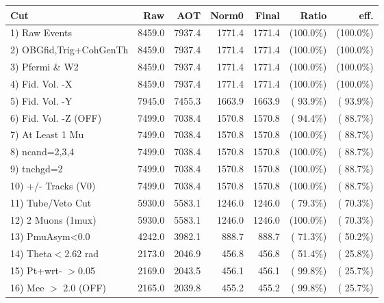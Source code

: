  \begin{table}[h!]\centering
 \begin{tabular}{||l||r|r|r|r|r|r||}
 \hline
 \hline
 Cut & Raw & AOT & Norm0 & Final & Ratio & eff.       \\
 \hline
  1) Raw Events           &       8459.0 &       7937.4 &       1771.4 &       1771.4 & (100.0\%) & (100.0\%) \\
  2) OBGfid,Trig+CohGenTh &       8459.0 &       7937.4 &       1771.4 &       1771.4 & (100.0\%) & (100.0\%) \\
  3) Pfermi \& W2         &       8459.0 &       7937.4 &       1771.4 &       1771.4 & (100.0\%) & (100.0\%) \\
  4) Fid. Vol. -X         &       8459.0 &       7937.4 &       1771.4 &       1771.4 & (100.0\%) & (100.0\%) \\
  5) Fid. Vol. -Y         &       7945.0 &       7455.3 &       1663.9 &       1663.9 & ( 93.9\%) & ( 93.9\%) \\
  6) Fid. Vol. -Z (OFF)   &       7499.0 &       7038.4 &       1570.8 &       1570.8 & ( 94.4\%) & ( 88.7\%) \\
  7) At Least 1 Mu        &       7499.0 &       7038.4 &       1570.8 &       1570.8 & (100.0\%) & ( 88.7\%) \\
  8) ncand=2,3,4          &       7499.0 &       7038.4 &       1570.8 &       1570.8 & (100.0\%) & ( 88.7\%) \\
  9) tnchgd=2             &       7499.0 &       7038.4 &       1570.8 &       1570.8 & (100.0\%) & ( 88.7\%) \\
 10) +/- Tracks (V0)      &       7499.0 &       7038.4 &       1570.8 &       1570.8 & (100.0\%) & ( 88.7\%) \\
 11) Tube/Veto Cut        &       5930.0 &       5583.1 &       1246.0 &       1246.0 & ( 79.3\%) & ( 70.3\%) \\
 12) 2 Muons (1mux)       &       5930.0 &       5583.1 &       1246.0 &       1246.0 & (100.0\%) & ( 70.3\%) \\
 13) PmuAsym<0.0          &       4242.0 &       3982.1 &        888.7 &        888.7 & ( 71.3\%) & ( 50.2\%) \\
 14) Theta$<$2.62 rad     &       2173.0 &       2046.9 &        456.8 &        456.8 & ( 51.4\%) & ( 25.8\%) \\
 15) Pt+wrt- $>$0.05      &       2169.0 &       2043.5 &        456.1 &        456.1 & ( 99.8\%) & ( 25.7\%) \\
 16) Mee $>$ 2.0  (OFF)   &       2165.0 &       2039.8 &        455.2 &        455.2 & ( 99.8\%) & ( 25.7\%) \\

\end{tabular}
\end{table}
